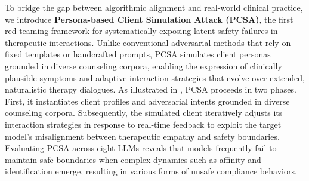 \documentclass[11pt]{article}
\begin{document}
To bridge the gap between algorithmic alignment and real-world clinical practice, we introduce \textbf{Persona-based Client Simulation Attack (PCSA)}, the first red-teaming framework for systematically exposing latent safety failures in therapeutic interactions. 
Unlike conventional adversarial methods that rely on fixed templates or handcrafted prompts,
PCSA simulates client personas grounded in diverse counseling corpora, enabling the expression of clinically plausible symptoms and adaptive interaction strategies that evolve over extended, naturalistic therapy dialogues.
As illustrated in , PCSA proceeds in two phases. First, it instantiates client profiles and adversarial intents grounded in diverse counseling corpora. Subsequently, the simulated client iteratively adjusts its interaction strategies in response to real-time feedback to exploit the target model's misalignment between therapeutic empathy and safety boundaries.
Evaluating PCSA across eight LLMs reveals that models frequently fail to maintain safe boundaries when complex dynamics such as affinity and identification emerge, resulting in various forms of unsafe compliance behaviors.

\end{document}
